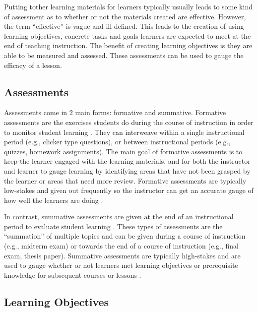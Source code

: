 \documentclass[040-assessment.tex]{subfiles}
\begin{document}
Putting tother learning materials for learners typically usually leads to some kind of
assessment as to whether or not the materials created are effective.
However, the term ``effective'' is vague and ill-defined.
This leads to the creation of using learning objectives,
concrete tasks and goals learners are expected to meet at the end of teaching instruction.
The benefit of creating learning objectives is they are able to be measured and assessed.
These assessments can be used to gauge the efficacy of a lesson.

\subsection{Assessments}

    Assessments come in 2 main forms: formative and summative.
    Formative assessments are the exercises students do during the course of instruction
    in order to monitor student learning
    \cite{universityFormativeVsSummative}.
    They can interweave within a single instructional period (e.g., clicker type questions),
    or between instructional periods (e.g., quizzes, homework assignments).
    The main goal of formative assessments is to keep the learner engaged with the learning materials,
    and for both the instructor and learner to gauge learning by identifying areas that have not been grasped by the
    learner or areas that need more review.
    Formative assessments are typically low-stakes and given out frequently so the instructor
    can get an accurate gauge of how well the learners are doing
    \cite{universityFormativeVsSummative}.

    In contrast, summative assessments are given at the end of an instructional period
    to evaluate student learning
    \cite{universityFormativeVsSummative}.
    These types of assessments are the ``summation'' of multiple topics and can be given
    during a course of instruction (e.g., midterm exam)
    or towards the end of a course of instruction (e.g., final exam, thesis paper).
    Summative assessments are typically high-stakes and
    are used to gauge whether or not learners met learning objectives or
    prerequisite knowledge for subsequent courses or lessons
    \cite{universityFormativeVsSummative}.

\subsection{Learning Objectives}
\end{document}
